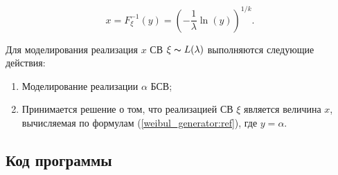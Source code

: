 \begin{equation}
		x = F_{\xi}^{-1}(y) = \left(-\frac{1}{\lambda}\ln(y)\right)^{1/k}.
		\label{weibul_generator:ref}
\end{equation}

Для моделирования реализация $x$ СВ $\xi \thicksim L(\lambda)$ выполняются следующие действия:
\begin{enumerate}
	\item Моделирование реализации $\alpha$ БСВ;
	\item Принимается решение о том, что реализацией СВ $\xi$ является величина $x$, вычисляемая по формулам (\ref{weibul_generator:ref}), где $y=\alpha$.
\end{enumerate}

\subsection{Код программы}



